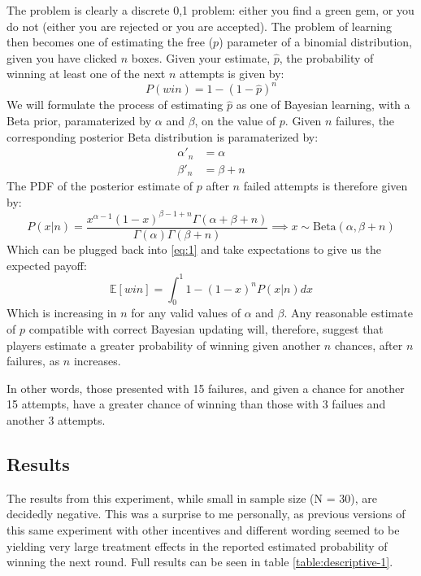 \documentclass[a4paper,12pt]{article}
\begin{document}
The problem is clearly a discrete 0,1 problem: either you find a green gem, or you do not (either you are rejected or you are accepted). The problem of learning then becomes one of estimating the free ($p$) parameter of a binomial distribution, given you have clicked $n$ boxes. Given your estimate, $\hat{p}$, the probability of winning at least one of the next $n$ attempts is given by:
\begin{equation} \label {eq:1}
  P(win) = 1 - (1-\hat{p})^n
\end{equation}
%
We will formulate the process of estimating $\hat{p}$ as one of Bayesian learning, with a Beta prior, paramaterized by $\alpha$ and $\beta$, on the value of $p$. Given $n$ failures, the corresponding posterior Beta distribution is paramaterized by:
\begin{align*}
  \alpha'_{n} &= \alpha \\
  \beta'_{n} &= \beta + n
\end{align*}
The PDF of the posterior estimate of $p$ after $n$ failed attempts is therefore given by:
$$
P(x | n) = \frac{ x^{\alpha - 1}(1 - x)^{\beta - 1 + n} \Gamma(\alpha + \beta + n)}{\Gamma(\alpha) \Gamma(\beta + n)} \implies x \sim \text{Beta}(\alpha, \beta + n)
$$
Which can be plugged back into \ref{eq:1} and take expectations to give us the expected payoff:
$$
\mathbb{E}[win] = \int_0^1 1 - \left( 1 - x \right)^n P(x | n) dx
$$
Which is increasing in $n$ for any valid values of $\alpha$ and $\beta$. Any reasonable estimate of $p$ compatible with correct Bayesian updating will, therefore, suggest that players estimate a greater probability of winning given another $n$ chances, after $n$ failures, as $n$ increases.

In other words, those presented with 15 failures, and given a chance for another 15 attempts, have a greater chance of winning than those with 3 failues and another 3 attempts.

\subsection{ Results }

The results from this experiment, while small in sample size (N = 30), are decidedly negative. This was a surprise to me personally, as previous versions of this same experiment with other incentives and different wording seemed to be yielding very large treatment effects in the reported estimated probability of winning the next round. Full results can be seen in table \ref{table:descriptive-1}.
\end{document}
